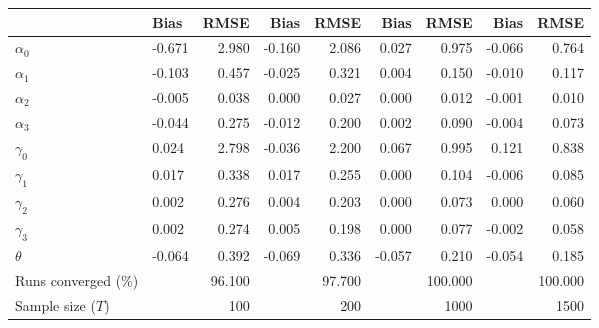 
\begin{tabular}[t]{llrrrrrrr}
\toprule
  & Bias & RMSE & Bias & RMSE & Bias & RMSE & Bias & RMSE\\
\midrule
$\alpha_{0}$ & -0.671 & 2.980 & -0.160 & 2.086 & 0.027 & 0.975 & -0.066 & 0.764\\
$\alpha_{1}$ & -0.103 & 0.457 & -0.025 & 0.321 & 0.004 & 0.150 & -0.010 & 0.117\\
$\alpha_{2}$ & -0.005 & 0.038 & 0.000 & 0.027 & 0.000 & 0.012 & -0.001 & 0.010\\
$\alpha_{3}$ & -0.044 & 0.275 & -0.012 & 0.200 & 0.002 & 0.090 & -0.004 & 0.073\\
$\gamma_{0}$ & 0.024 & 2.798 & -0.036 & 2.200 & 0.067 & 0.995 & 0.121 & 0.838\\
$\gamma_{1}$ & 0.017 & 0.338 & 0.017 & 0.255 & 0.000 & 0.104 & -0.006 & 0.085\\
$\gamma_{2}$ & 0.002 & 0.276 & 0.004 & 0.203 & 0.000 & 0.073 & 0.000 & 0.060\\
$\gamma_{3}$ & 0.002 & 0.274 & 0.005 & 0.198 & 0.000 & 0.077 & -0.002 & 0.058\\
$\theta$ & -0.064 & 0.392 & -0.069 & 0.336 & -0.057 & 0.210 & -0.054 & 0.185\\
Runs converged (\%) &  & 96.100 &  & 97.700 &  & 100.000 &  & 100.000\\
Sample size ($T$) &  & 100 &  & 200 &  & 1000 &  & 1500\\
\bottomrule
\end{tabular}
